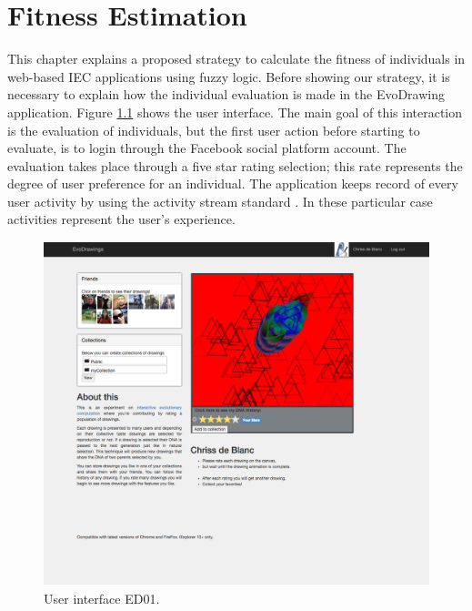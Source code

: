 \chapter{Fitness Estimation}

This chapter explains a proposed strategy to calculate the fitness of
individuals in web-based IEC applications
using fuzzy logic. Before showing our strategy, it is necessary to explain how
the individual evaluation is made in the EvoDrawing application. Figure
\ref{fig:UI_ED} shows the user interface.
The main goal of this interaction is the evaluation of individuals, but
the first user action before starting to evaluate, is to login through the
Facebook \cite{facebook} social
platform account. The evaluation takes place through a
five star rating selection; this rate represents the degree of user
preference for an individual. The application keeps record of every user
activity by using the activity stream standard \cite{snell2014json}.
In these particular case activities represent the user's experience.

\begin{figure}
\captionsetup{justification=centering,margin=2cm}
\centering
\setlength\fboxsep{0pt}
\setlength\fboxrule{0.7pt}
\includegraphics[width=12cm,height=10cm,keepaspectratio]{img/UI_ed01.png}
\caption{User interface ED01.}
\label{fig:UI_ED}
\end{figure}

